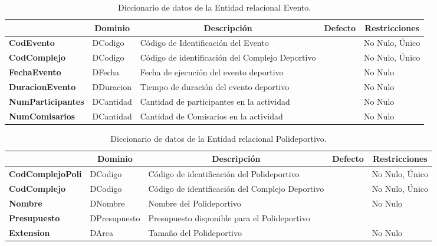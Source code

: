 \begin{table}[H]
\centering
\caption{Diccionario de datos de la Entidad relacional Evento.}
\label{tab-DiccR-1f}
\begin{tabular}{>{\bfseries}m{4.0cm}>{}m{3.0cm}>{}m{6.0cm}>{}m{5.0cm}>{}m{2.0cm}}
\toprule
\multicolumn{1}{c}{\textbf{Atributo}} & \multicolumn{1}{c}{\textbf{Dominio}} & \multicolumn{1}{c}{\textbf{Descripción}} & \multicolumn{1}{c}{\textbf{Defecto}} & \multicolumn{1}{c}{\textbf{Restricciones}} \\ \midrule
CodEvento	&	DCodigo	&	Código de Identificación del Evento	&		&	No Nulo, Único\\
CodComplejo	&	DCodigo	&	Código de identificación del Complejo Deportivo	&		&	No Nulo, Único\\
FechaEvento	&	DFecha	&	Fecha de ejecución del evento deportivo	&		&	No Nulo\\
DuracionEvento	&	DDuracion	&	Tiempo de duración del evento deportivo	&		&	No Nulo\\
NumParticipantes	&	DCantidad	&	Cantidad de participantes en la actividad	&		&	No Nulo\\
NumComisarios	&	DCantidad	&	Cantidad de Comisarios en la actividad	&		&	No Nulo\\\bottomrule
\end{tabular}
\end{table}

\begin{table}[H]
\centering
\caption{Diccionario de datos de la Entidad relacional Polideportivo.}
\label{tab-DiccR-1g}
\begin{tabular}{>{\bfseries}m{4.0cm}>{}m{3.0cm}>{}m{6.0cm}>{}m{5.0cm}>{}m{2.0cm}}
\toprule
\multicolumn{1}{c}{\textbf{Atributo}} & \multicolumn{1}{c}{\textbf{Dominio}} & \multicolumn{1}{c}{\textbf{Descripción}} & \multicolumn{1}{c}{\textbf{Defecto}} & \multicolumn{1}{c}{\textbf{Restricciones}} \\ \midrule
CodComplejoPoli	&	DCodigo	&	Código de identificación del Polideportivo	&		&	No Nulo, Único\\
CodComplejo	&	DCodigo	&	Código de identificación del Complejo Deportivo	&		&	No Nulo, Único\\
Nombre	&	DNombre	&	Nombre del Polideportivo	&		&	No Nulo\\
Presupuesto	&	DPresupuesto	&	Presupuesto disponible para el Polideportivo	&		&	\\
Extension	&	DArea	&	Tamaño del Polideportivo	&		&	No Nulo\\\bottomrule
\end{tabular}
\end{table}

